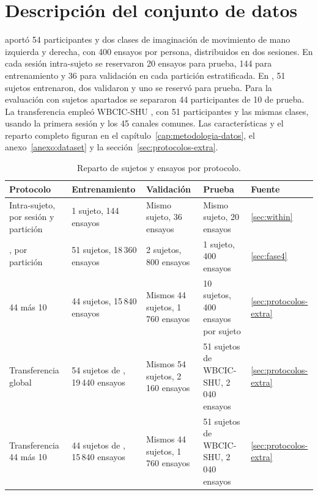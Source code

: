 \section{Descripción del conjunto de datos}
\openbmi{} \cite{lee2019} aportó 54 participantes y dos clases de imaginación de movimiento de mano izquierda y derecha, con 400 ensayos por persona, distribuidos en dos sesiones. En cada sesión intra-sujeto se reservaron 20 ensayos para prueba, 144 para entrenamiento y 36 para validación en cada partición estratificada. En \loso{}, 51 sujetos entrenaron, dos validaron y uno se reservó para prueba. Para la evaluación con sujetos apartados se separaron 44 participantes de 10 de prueba. La transferencia empleó WBCIC-SHU \cite{yang2025wbcic}, con 51 participantes y las mismas clases, usando la primera sesión y los 45 canales comunes. Las características y el reparto completo figuran en el capítulo~\ref{cap:metodologia-datos}, el anexo~\ref{anexo:dataset} y la sección~\ref{sec:protocolos-extra}.

\begin{table}[H]
\centering
\caption{Reparto de sujetos y ensayos por protocolo.}
\label{tab:reparto-protocolos}
\small
\begin{tabular}{p{2.7cm}p{3.1cm}p{3.1cm}p{3.1cm}p{1.2cm}}
\toprule
\textbf{Protocolo} & \textbf{Entrenamiento} & \textbf{Validación} & \textbf{Prueba} & \textbf{Fuente} \\
\midrule
Intra-sujeto, por sesión y partición & 1 sujeto, 144 ensayos & Mismo sujeto, 36 ensayos & Mismo sujeto, 20 ensayos & \ref{sec:within} \\
\loso{}, por partición & 51 sujetos, 18\,360 ensayos & 2 sujetos, 800 ensayos & 1 sujeto, 400 ensayos & \ref{sec:fase4} \\
44 más 10 & 44 sujetos, 15\,840 ensayos & Mismos 44 sujetos, 1\,760 ensayos & 10 sujetos, 400 ensayos por sujeto & \ref{sec:protocolos-extra} \\
Transferencia global & 54 sujetos de \openbmi{}, 19\,440 ensayos & Mismos 54 sujetos, 2\,160 ensayos & 51 sujetos de WBCIC-SHU, 2\,040 ensayos & \ref{sec:protocolos-extra} \\
Transferencia 44 más 10 & 44 sujetos de \openbmi{}, 15\,840 ensayos & Mismos 44 sujetos, 1\,760 ensayos & 51 sujetos de WBCIC-SHU, 2\,040 ensayos & \ref{sec:protocolos-extra} \\
\bottomrule
\end{tabular}
\end{table}
